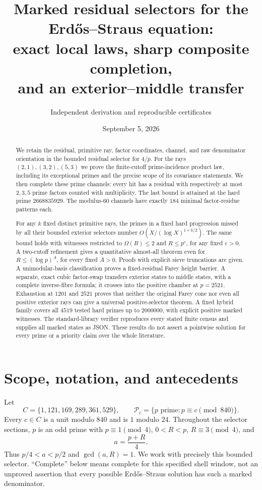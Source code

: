\documentclass[11pt]{article}
\title{Marked residual selectors for the Erd\H{o}s--Straus equation:\\
exact local laws, sharp composite completion,\\and an exterior--middle transfer}
\author{Independent derivation and reproducible certificates}
\date{September 5, 2026}
\theoremstyle{remark}\newtheorem{remark}[theorem]{Remark}
\newcommand{\Pcal}{\mathcal P}
\newcommand{\Om}{\Omega}
\begin{document}
\maketitle
\begin{abstract}
We retain the residual, primitive ray, factor coordinates, channel, and raw denominator orientation in the bounded residual selector for $4/p$. For the rays $(2,1),(3,2),(5,3)$ we prove the finite-cutoff prime-incidence product law, including its exceptional primes and the precise scope of its covariance statements. We then complete these prime channels: every hit has a residual with respectively at most $2,3,5$ prime factors counted with multiplicity. The last bound is attained at the hard prime $2668835929$. The modulus-$60$ channels have exactly $184$ minimal factor-residue patterns each.

For any $k$ fixed distinct primitive rays, the primes in a fixed hard progression missed by all their bounded exterior selectors number $O(X/(\log X)^{1+k/2})$. The same bound holds with witnesses restricted to $\Om(R)\le2$ and $R\le p^\varepsilon$, for any fixed $\varepsilon>0$. A two-cutoff refinement gives a quantitative almost-all theorem even for $R\le(\log p)^A$, for every fixed $A>0$. Proofs with explicit sieve truncations are given. A unimodular-basis classification proves a fixed-residual Farey height barrier. A separate, exact cubic factor-swap transfers exterior states to middle states, with a complete inverse-fibre formula; it crosses into the positive chamber at $p=2521$. Exhaustion at $1201$ and $2521$ proves that neither the original Farey cone nor even all positive exterior rays can give a universal positive-selector theorem. A fixed hybrid family covers all $4519$ tested hard primes up to $2000000$, with explicit positive marked witnesses. The standard-library verifier reproduces every stated finite census and supplies all marked states as JSON. These results do not assert a pointwise solution for every prime or a priority claim over the whole literature.
\end{abstract}
\clearpage
\tableofcontents
\clearpage

\section{Scope, notation, and antecedents}
Let
\[
 C=\{1,121,169,289,361,529\},\qquad
 \Pcal_c=\{p\text{ prime}:p\equiv c\pmod{840}\}.
\]
Every $c\in C$ is a unit modulo $840$ and is $1$ modulo $24$. Throughout the selector sections, $p$ is an odd prime with $p\equiv1\pmod4$, $0<R<p$, $R\equiv3\pmod4$, and
\[
 a=\frac{p+R}{4}.
\]
Thus $p/4<a<p/2$ and $\gcd(a,R)=1$. We work with precisely this bounded selector. ``Complete'' below means complete for this specified shell window, not an unproved assertion that every possible Erd\H{o}s--Straus solution has such a marked denominator.
\end{document}
